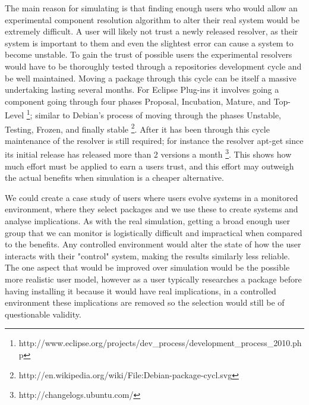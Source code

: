 The main reason for simulating is that finding enough users
who would allow an experimental component resolution algorithm to alter their real system would be extremely difficult.
A user will likely not trust a newly released resolver, as their system is important to them and even the slightest error can cause
a system to become unstable. 
To gain the trust of possible users the experimental resolvers would have to be thoroughly tested through a repositories development cycle and be well maintained.
Moving a package through this cycle can be itself a massive undertaking lasting several months. 
For Eclipse Plug-ins it involves going a component going through four phases 
Proposal, Incubation, Mature, and Top-Level \footnote{http://www.eclipse.org/projects/dev\_process/development\_process\_2010.php};
similar to Debian's process of moving through the phases Unstable, Testing, Frozen, and finally stable \footnote{http://en.wikipedia.org/wiki/File:Debian-package-cycl.svg}.
After it has been through this cycle maintenance of the resolver is still required; 
for instance the resolver apt-get since its initial release has released more than 2 versions a month \footnote{http://changelogs.ubuntu.com/}.
This shows how much effort must be applied to earn a users trust, and this effort may outweigh the actual benefits when simulation is a cheaper alternative.

We could create a case study of users where users evolve systems in a monitored environment, where they select packages and we use these to create systems and analyse implications.
As with the real simulation, getting a broad enough user group that we can monitor is logistically difficult and impractical when compared to the benefits.
Any controlled environment would alter the state of how the user interacts with their "control" system, making the results similarly less reliable.
The one aspect that would be improved over simulation would be the possible more realistic user model, 
however as a user typically researches a package before having installing it because it would have real implications, in a controlled environment these implications are removed so the selection would still be of questionable validity.

